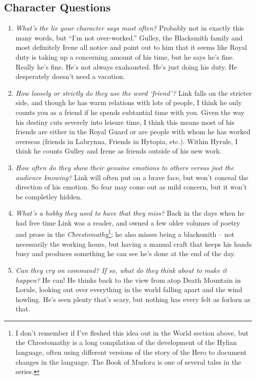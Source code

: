   \subsection{Character Questions}
  \begin{enumerate}
    \item\textit{What’s the lie your character says most often?} Probably not in exactly this many words, but ``I'm not over-worked.''  Gulley, the Blacksmith family and most definitely Irene all notice and point out to him that it seems like Royal duty is taking up a concerning amount of his time, but he says he's fine. Really he's fine. He's not always exahausted. He's just doing his duty. He desperately doesn't need a vacation.
    \item\textit{How loosely or strictly do they use the word ‘friend’?} Link falls on the stricter side, and though he has warm relations with lots of people, I think he only counts you as a friend if he spends subtantial time with you. Given the way his destiny cuts severely into leisure time, I think this means most of his friends are either in the Royal Guard or are people with whom he has worked overseas (friends in Labrynna, Friends in Hytopia, etc.). Within Hyrule, I think he counts Gulley and Irene as friends outside of his new work.
    \item\textit{How often do they show their genuine emotions to others versus just the audience knowing?} Link will often put on a brave face, but won't conceal the direction of his emotion. So fear may come out as mild concern, but it won't be completley hidden. 
    \item\textit{What’s a hobby they used to have that they miss?} Back in the days when he had free time Link was a reader, and owned a few older volumes of poetry and prose in the \emph{Chrestomathy}\footnote{I don't remember if I've fleshed this idea out in the World section above, but the Chrestomathy is a long compilation of the development of the Hylian language, often using different versions of the story of the Hero to document changes in the language. The Book of Mudora is one of several tales in the series.}; he also misses being a blacksmith -- not necessarily the working hours, but having a manual craft that keeps his hands busy and produces something he can see he's done at the end of the day.
    \item\textit{Can they cry on command? If so, what do they think about to make it happen?} He can! He thinks back to the view from atop Death Mountain in Lorule, looking out over everything in the world falling apart and the wind howling. He's seen plenty that's scary, but nothing has every felt as forlorn as that.

\end{enumerate}
